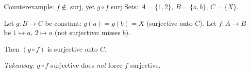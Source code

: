 \documentclass[11pt]{beamer}
\theoremstyle{plain}
\begin{document}
\begin{frame}{Counterexample: $f\notin$ surj, yet $g\circ f$ surj}
\small
Sets: $A=\{1,2\}$, $B=\{a,b\}$, $C=\{X\}$.

Let $g:B\to C$ be constant: $g(a)=g(b)=X$ (surjective onto $C$).
Let $f:A\to B$ be $1\mapsto a,\ 2\mapsto a$ (not surjective: misses $b$).

Then $(g\circ f)$ is surjective onto $C$.
\medskip

\textit{Takeaway:} $g\circ f$ surjective does \emph{not} force $f$ surjective.
\end{frame}












\end{document}
